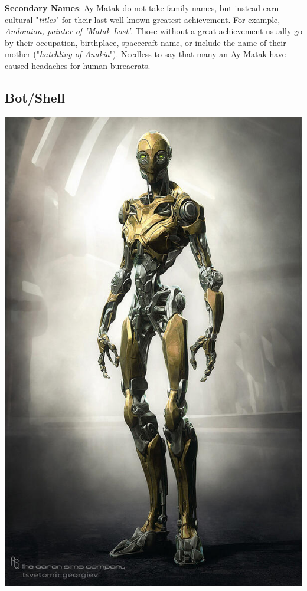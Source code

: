 \documentclass[10pt,twoside]{article}
\begin{document}
\begin{multicols}{2}
  \textbf{Secondary Names}: Ay-Matak do not take family names, but instead earn cultural "\textit{titles}" for their last well-known greatest achievement. For example, \textit{Andomion, painter of 'Matak Lost'}. Those without a great achievement usually go by their occupation, birthplace, spacecraft name, or include the name of their mother ("\textit{hatchling of Anakia}"). Needless to say that many an Ay-Matak have caused headaches for human bureacrats.

  \columnbreak

  \subsection{Bot/Shell}

  \includegraphics[width=\linewidth]{BEzZuPdCEAAgcr8}


\end{multicols}
\end{document}
